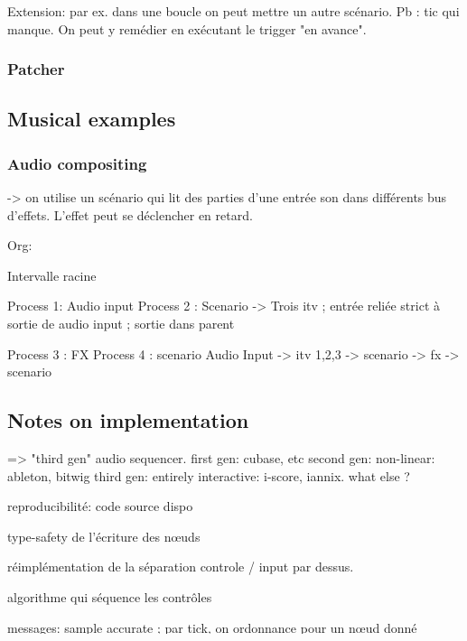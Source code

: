 \documentclass{article}
\begin{document}
Extension: par ex. dans une boucle on peut mettre un autre scénario.
Pb : tic qui manque. On peut y remédier en exécutant le trigger "en avance".
\subsubsection{Patcher}


\subsection{Musical examples}
\subsubsection{Audio compositing}
-> on utilise un scénario qui lit des parties d'une entrée son dans différents bus d'effets. L'effet peut se déclencher en retard.

Org: 

Intervalle racine

Process 1:  Audio input
Process 2 : Scenario
  -> Trois itv ; entrée reliée strict à sortie de audio input ; sortie dans parent
  
Process 3 : FX
Process 4 : scenario
Audio Input -> itv {1,2,3} -> scenario -> fx -> scenario

\subsection{Notes on implementation}


=> "third gen" audio sequencer.
first gen: cubase, etc
second gen: non-linear: ableton, bitwig
third gen: entirely interactive: i-score, iannix. what else ? 

reproducibilité: code source dispo

type-safety de l'écriture des nœuds

réimplémentation de la séparation controle / input par dessus.

algorithme qui séquence les contrôles

messages: sample accurate ; par tick, on ordonnance pour un nœud donné


\section{Evaluation and Discussion}
Enforcing graph constraints: mostly done through UI. For instance: ic are created on tc, etc. No "going back" which would break DAG-ness.
\end{document}

